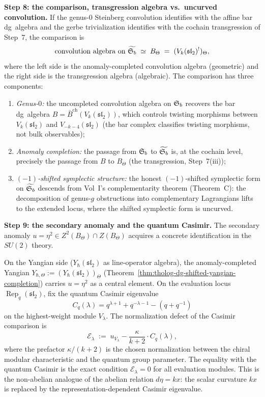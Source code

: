 \begin{construction}
\medskip
\noindent\textbf{Step 8: the comparison, transgression algebra
vs.\ uncurved convolution.}
If the genus-$0$ Steinberg convolution identifies with the affine
bar dg~algebra and the gerbe trivialization identifies with the
cochain transgression of Step~7, the comparison is
\begin{equation}\label{eq:su2-comparison}
\text{convolution algebra on }\widetilde{\mathfrak{S}_b}
\;\simeq\;
B_\Theta
\;=\;
(V_k(\mathfrak{sl}_2)^!)_\Theta,
\end{equation}
where the left side is the anomaly-completed convolution algebra
(geometric) and the right side is the transgression algebra
(algebraic). The comparison has three components:
\begin{enumerate}[label=\textup{(\alph*)}]
\item \emph{Genus-$0$:} the uncompleted convolution algebra on $\mathfrak{S}_b$
 recovers the bar dg~algebra $B = \bar B^{\mathrm{ch}}(V_k(\mathfrak{sl}_2))$,
 which controls twisting morphisms between $V_k(\mathfrak{sl}_2)$ and
 $V_{-k-4}(\mathfrak{sl}_2)$ (the bar complex classifies
 twisting morphisms, not bulk observables);
\item \emph{Anomaly completion:} the passage from $\mathfrak{S}_b$ to
 $\widetilde{\mathfrak{S}_b}$ is, at the cochain level, precisely the passage
 from $B$ to $B_\Theta$ (the transgression, Step~7(iii));
\item \emph{$(-1)$-shifted symplectic structure:} the honest
 $(-1)$-shifted symplectic form on $\widetilde{\mathfrak{S}_b}$ descends from
 Vol~I's complementarity theorem (Theorem~C): the
 decomposition of genus-$g$ obstructions into complementary
 Lagrangians lifts to the extended locus, where the shifted
 symplectic form is uncurved.
\end{enumerate}

\medskip
\noindent\textbf{Step 9: the secondary anomaly and the quantum
Casimir.}
The secondary anomaly $u = \eta^2\in Z^2(B_\Theta)\cap Z(B_\Theta)$
acquires a concrete identification in the $SU(2)$ theory.

On the Yangian side ($Y_\hbar(\mathfrak{sl}_2)$ as line-operator
algebra), the anomaly-completed Yangian
$Y_{\hbar,\Theta} := (Y_\hbar(\mathfrak{sl}_2))_\Theta$
(Theorem~\ref{thm:tholog-dg-shifted-yangian-completion})
carries $u = \eta^2$ as a central element. On the evaluation
locus $\operatorname{Rep}_q(\mathfrak{sl}_2)$, fix the quantum
Casimir eigenvalue
\[
C_q(\lambda)=q^{\lambda+1}+q^{-\lambda-1}-(q+q^{-1})
\]
on the highest-weight module \(V_\lambda\).  The normalization
defect of the Casimir comparison is
\begin{equation}\label{eq:su2-secondary-casimir}
\mathcal E_\lambda
\;:=\;
u_{V_\lambda}
-
\frac{\kappa}{k+2}
\cdot
C_q(\lambda),
\end{equation}
where the prefactor \(\kappa/(k+2)\) is the chosen normalization
between the chiral modular characteristic and the quantum group
parameter.  The equality with the quantum Casimir is the exact
condition \(\mathcal E_\lambda=0\) for all evaluation modules.  This
is the non-abelian analogue of the abelian relation \(d\eta=kx\):
the scalar curvature \(kx\) is replaced by the representation-dependent
Casimir eigenvalue.


\end{construction}
